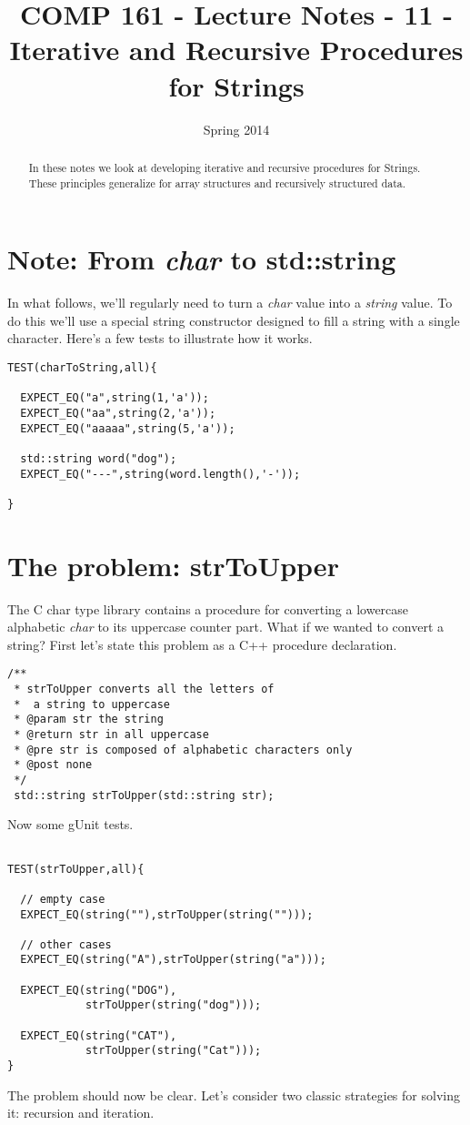 \documentclass[]{tufte-handout}
\title{COMP 161 - Lecture Notes - 11 - Iterative and Recursive Procedures for Strings}
\date{Spring 2014}
\begin{document}
 
\maketitle

\begin{abstract}
In these notes we look at developing iterative and recursive procedures for Strings.  These principles generalize for array structures and recursively structured data. 
\end{abstract}

\section{Note: From \textit{char} to std::string}

In what follows, we'll regularly need to turn a \textit{char} value into a \textit{string} value.  To do this we'll use a special string constructor designed to fill a string with a single character. Here's a few tests to illustrate how it works.
\begin{verbatim}
TEST(charToString,all){

  EXPECT_EQ("a",string(1,'a'));
  EXPECT_EQ("aa",string(2,'a'));
  EXPECT_EQ("aaaaa",string(5,'a'));

  std::string word("dog");
  EXPECT_EQ("---",string(word.length(),'-')); 

}
\end{verbatim}

\section{The problem: strToUpper}

The C char type library contains a procedure for converting a lowercase alphabetic \textit{char} to its uppercase counter part. What if we wanted to convert a string?  First let's state this problem as a C++ procedure declaration.
\begin{verbatim}
/** 
 * strToUpper converts all the letters of 
 *  a string to uppercase
 * @param str the string
 * @return str in all uppercase
 * @pre str is composed of alphabetic characters only
 * @post none
 */
 std::string strToUpper(std::string str);
\end{verbatim}
Now some gUnit tests.
\begin{verbatim}

TEST(strToUpper,all){

  // empty case
  EXPECT_EQ(string(""),strToUpper(string("")));

  // other cases
  EXPECT_EQ(string("A"),strToUpper(string("a")));

  EXPECT_EQ(string("DOG"),
            strToUpper(string("dog")));
          
  EXPECT_EQ(string("CAT"),
            strToUpper(string("Cat")));
}
\end{verbatim}
The problem should now be clear.  Let's consider two classic strategies for solving it: recursion and iteration.
\end{document}
